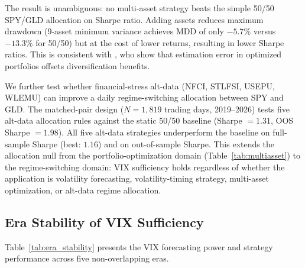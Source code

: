 \documentclass[12pt,a4paper]{article}
\begin{document}
The result is unambiguous: no multi-asset strategy beats the simple 50/50 SPY/GLD allocation on Sharpe ratio. Adding assets reduces maximum drawdown (9-asset minimum variance achieves MDD of only $-5.7\%$ versus $-13.3\%$ for 50/50) but at the cost of lower returns, resulting in lower Sharpe ratios. This is consistent with \citet{demiguel2009}, who show that estimation error in optimized portfolios offsets diversification benefits.

We further test whether financial-stress alt-data (NFCI, STLFSI, USEPU, WLEMU) can improve a daily regime-switching allocation between SPY and GLD. The matched-pair design ($N = 1{,}819$ trading days, 2019--2026) tests five alt-data allocation rules against the static 50/50 baseline (Sharpe $= 1.31$, OOS Sharpe $= 1.98$). All five alt-data strategies underperform the baseline on full-sample Sharpe (best: $1.16$) and on out-of-sample Sharpe. This extends the allocation null from the portfolio-optimization domain (Table~\ref{tab:multiasset}) to the regime-switching domain: VIX sufficiency holds regardless of whether the application is volatility forecasting, volatility-timing strategy, multi-asset optimization, or alt-data regime allocation.

\subsection{Era Stability of VIX Sufficiency}

Table~\ref{tab:era_stability} presents the VIX forecasting power and strategy performance across five non-overlapping eras.
\end{document}
